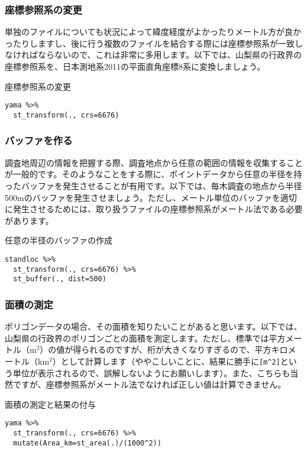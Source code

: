 \subsubsection{座標参照系の変更}
単独のファイルについても状況によって緯度経度がよかったりメートル方が良かったりしますし、後に行う複数のファイルを結合する際には座標参照系が一致しなければならないので、これは非常に多用します。以下では、山梨県の行政界の座標参照系を、日本測地系2011の平面直角座標8系に変換しましょう。
\begin{itembox}[l]{座標参照系の変更}
\begin{verbatim}
yama %>%
  st_transform(., crs=6676)
\end{verbatim}
\end{itembox}

\subsubsection{バッファを作る}
調査地周辺の情報を把握する際、調査地点から任意の範囲の情報を収集することが一般的です。そのようなことをする際に、ポイントデータから任意の半径を持ったバッファを発生させることが有用です。以下では、毎木調査の地点から半径500mのバッファを発生させましょう。ただし、メートル単位のバッファを適切に発生させるためには、取り扱うファイルの座標参照系がメートル法である必要があります。
\begin{itembox}[l]{任意の半径のバッファの作成}
\begin{verbatim}
standloc %>%
  st_transform(., crs=6676) %>%
  st_buffer(., dist=500)
\end{verbatim}
\end{itembox}

\subsubsection{面積の測定}
ポリゴンデータの場合、その面積を知りたいことがあると思います。以下では、山梨県の行政界のポリゴンごとの面積を測定します。ただし、標準では平方メートル（m$^{2}$）の値が得られるのですが、桁が大きくなりすぎるので、平方キロメートル（km$^{2}$）として計算します（ややこしいことに、結果に勝手に\verb|[m^2]|という単位が表示されるので、誤解しないようにお願いします）。また、こちらも当然ですが、座標参照系がメートル法でなければ正しい値は計算できません。
\begin{itembox}[l]{面積の測定と結果の付与}
\begin{verbatim}
yama %>%
  st_transform(., crs=6676) %>%
  mutate(Area_km=st_area(.)/(1000^2))
\end{verbatim}
\end{itembox}

